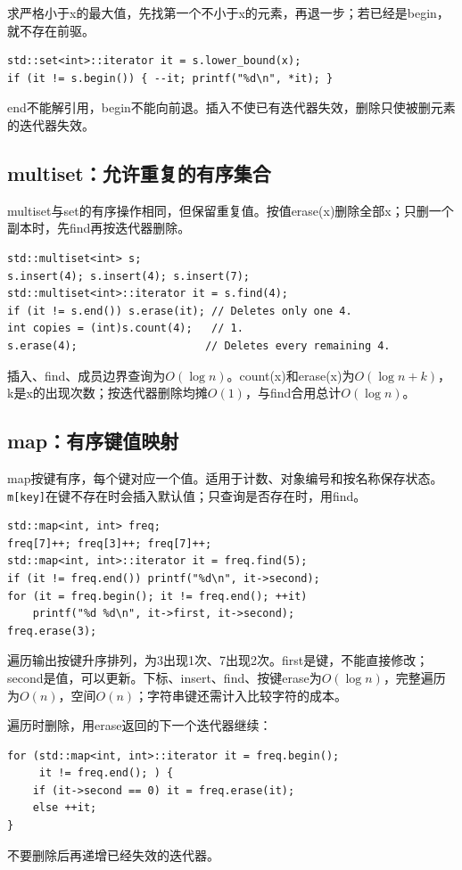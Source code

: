 求严格小于x的最大值，先找第一个不小于x的元素，再退一步；若已经是begin，就不存在前驱。
\begin{lstlisting}
std::set<int>::iterator it = s.lower_bound(x);
if (it != s.begin()) { --it; printf("%d\n", *it); }
\end{lstlisting}
end不能解引用，begin不能向前退。插入不使已有迭代器失效，删除只使被删元素的迭代器失效。

\subsection{multiset：允许重复的有序集合}
multiset与set的有序操作相同，但保留重复值。按值erase(x)删除全部x；只删一个副本时，先find再按迭代器删除。
\begin{lstlisting}
std::multiset<int> s;
s.insert(4); s.insert(4); s.insert(7);
std::multiset<int>::iterator it = s.find(4);
if (it != s.end()) s.erase(it); // Deletes only one 4.
int copies = (int)s.count(4);   // 1.
s.erase(4);                    // Deletes every remaining 4.
\end{lstlisting}
插入、find、成员边界查询为$O(\log n)$。count(x)和erase(x)为$O(\log n+k)$，k是x的出现次数；按迭代器删除均摊$O(1)$，与find合用总计$O(\log n)$。

\subsection{map：有序键值映射}
map按键有序，每个键对应一个值。适用于计数、对象编号和按名称保存状态。\texttt{m[key]}在键不存在时会插入默认值；只查询是否存在时，用find。
\begin{lstlisting}
std::map<int, int> freq;
freq[7]++; freq[3]++; freq[7]++;
std::map<int, int>::iterator it = freq.find(5);
if (it != freq.end()) printf("%d\n", it->second);
for (it = freq.begin(); it != freq.end(); ++it)
    printf("%d %d\n", it->first, it->second);
freq.erase(3);
\end{lstlisting}
遍历输出按键升序排列，为3出现1次、7出现2次。first是键，不能直接修改；second是值，可以更新。下标、insert、find、按键erase为$O(\log n)$，完整遍历为$O(n)$，空间$O(n)$；字符串键还需计入比较字符的成本。

遍历时删除，用erase返回的下一个迭代器继续：
\begin{lstlisting}
for (std::map<int, int>::iterator it = freq.begin();
     it != freq.end(); ) {
    if (it->second == 0) it = freq.erase(it);
    else ++it;
}
\end{lstlisting}
不要删除后再递增已经失效的迭代器。


